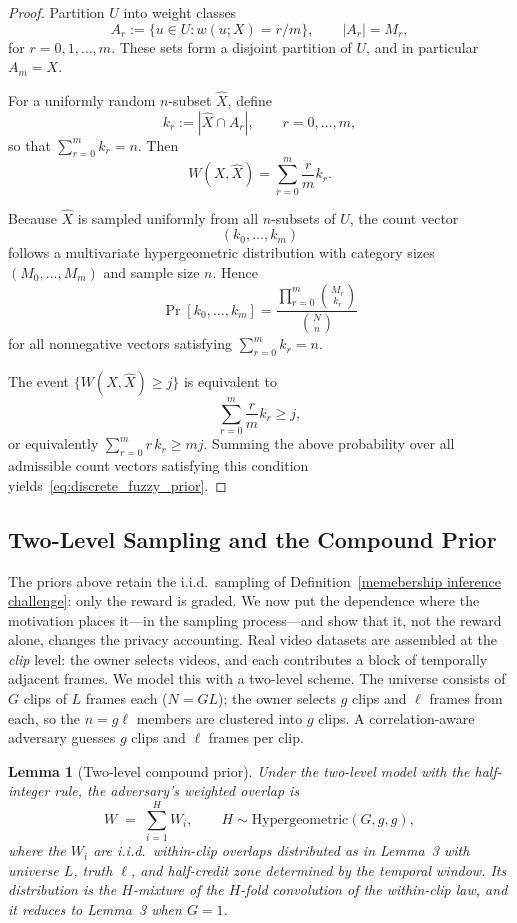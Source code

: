\documentclass[sigconf,anonymous, review]{acmart}
\newtheorem{lemma}[theorem]{Lemma}
\begin{document}
\begin{proof}
Partition $U$ into weight classes
\[
A_r := \{u \in U : w(u;X) = r/m\},
\qquad |A_r| = M_r,
\]
for $r=0,1,\dots,m$.
These sets form a disjoint partition of $U$, and in particular $A_m = X$.

For a uniformly random $n$-subset $\widehat{X}$, define
\[
k_r := |\widehat{X} \cap A_r|, \qquad r=0,\dots,m,
\]
so that $\sum_{r=0}^m k_r = n$.
Then
\[
W(X,\widehat{X})
=
\sum_{r=0}^m \frac{r}{m} k_r.
\]

Because $\widehat{X}$ is sampled uniformly from all $n$-subsets of $U$, the count vector
\[
(k_0,\dots,k_m)
\]
follows a multivariate hypergeometric distribution with category sizes $(M_0,\dots,M_m)$ and sample size $n$. Hence
\[
\Pr[k_0,\dots,k_m]
=
\frac{\prod_{r=0}^m \binom{M_r}{k_r}}{\binom{N}{n}}
\]
for all nonnegative vectors satisfying $\sum_{r=0}^m k_r = n$.

The event $\{W(X,\widehat{X}) \ge j\}$ is equivalent to
\[
\sum_{r=0}^m \frac{r}{m}k_r \ge j,
\]
or equivalently $\sum_{r=0}^m r\,k_r \ge mj$.
Summing the above probability over all admissible count vectors satisfying this condition yields~\eqref{eq:discrete_fuzzy_prior}.
\end{proof}

\subsection{Two-Level Sampling and the Compound Prior}
\label{subsec:two_level}

The priors above retain the i.i.d.\ sampling of Definition~\ref{memebership inference challenge}: only the reward is graded. We now put the dependence where the motivation places it---in the sampling process---and show that it, not the reward alone, changes the privacy accounting. Real video datasets are assembled at the \emph{clip} level: the owner selects videos, and each contributes a block of temporally adjacent frames. We model this with a two-level scheme. The universe consists of $G$ clips of $L$ frames each ($N = GL$); the owner selects $g$ clips and $\ell$ frames from each, so the $n = g\ell$ members are clustered into $g$ clips. A correlation-aware adversary guesses $g$ clips and $\ell$ frames per clip.

\begin{lemma}[Two-level compound prior]
\label{lem:two_level}
Under the two-level model with the half-integer rule, the adversary's weighted overlap is
\[
W \;=\; \sum_{i=1}^{H} W_i,
\qquad
H \sim \mathrm{Hypergeometric}(G, g, g),
\]
where the $W_i$ are i.i.d.\ within-clip overlaps distributed as in Lemma~3 with universe $L$, truth $\ell$, and half-credit zone determined by the temporal window. Its distribution is the $H$-mixture of the $H$-fold convolution of the within-clip law, and it reduces to Lemma~3 when $G=1$.
\end{lemma}
\end{document}
